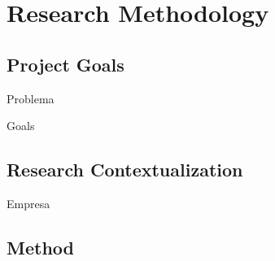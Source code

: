 \chapter{Research Methodology}
\label{chap:Chapter3}

\section{Project Goals}

Problema

Goals

\section{Research Contextualization}
Empresa

\section{Method}

